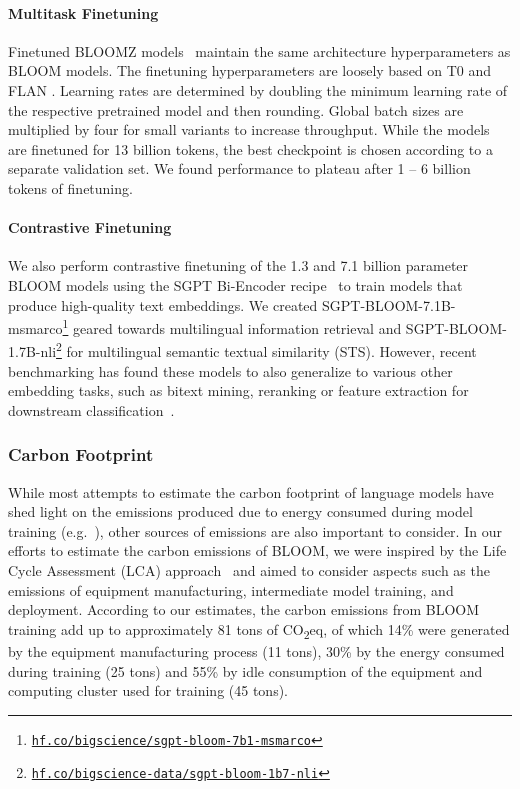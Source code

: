 \documentclass[twoside,11pt]{article}
\newcommand{\carboneq}{CO\textsubscript{2}eq}
\begin{document}
\paragraph{Multitask Finetuning} Finetuned BLOOMZ models~\citep{muennighoff2022crosslingual} maintain the same architecture hyperparameters as BLOOM models. The finetuning hyperparameters are loosely based on T0 \citep{sanh2022multitask} and FLAN \citep{wei2021finetuned}. Learning rates are determined by doubling the minimum learning rate of the respective pretrained model and then rounding. Global batch sizes are multiplied by four for small variants to increase throughput. While the models are finetuned for 13 billion tokens, the best checkpoint is chosen according to a separate validation set. We found performance to plateau after 1 -- 6 billion tokens of finetuning.

\paragraph{Contrastive Finetuning} We also perform contrastive finetuning of the 1.3 and 7.1 billion parameter BLOOM models using the SGPT Bi-Encoder recipe~\citep{muennighoff2022sgpt} to train models that produce high-quality text embeddings. We created SGPT-BLOOM-7.1B-msmarco\footnote{\href{https://hf.co/bigscience/sgpt-bloom-7b1-msmarco}{\texttt{hf.co/bigscience/sgpt-bloom-7b1-msmarco}}} geared towards multilingual information retrieval and SGPT-BLOOM-1.7B-nli\footnote{\href{https://hf.co/bigscience-data/sgpt-bloom-1b7-nli}{\texttt{hf.co/bigscience-data/sgpt-bloom-1b7-nli}}} for multilingual semantic textual similarity (STS). However, recent benchmarking has found these models to also generalize to various other embedding tasks, such as bitext mining, reranking or feature extraction for downstream classification~\citep{muennighoff2022mteb}.

\subsubsection{Carbon Footprint}

While most attempts to estimate the carbon footprint of language models have shed light on the emissions produced due to energy consumed during model training (e.g.~\citealp{patterson2021carbon, strubell2019energy}), other sources of emissions are also important to consider. In our efforts to estimate the carbon emissions of BLOOM, we were inspired by the Life Cycle Assessment (LCA) approach~\citep{klopffer1997life} and aimed to consider aspects such as the emissions of equipment manufacturing, intermediate model training, and deployment. According to our estimates, the carbon emissions from BLOOM training add up to approximately 81 tons of \carboneq, of which 14\% were generated by the equipment manufacturing process (11 tons), 30\% by the energy consumed during training (25 tons) and 55\% by idle consumption of the equipment and computing cluster used for training (45 tons). 
\end{document}
